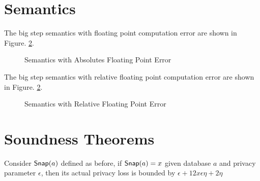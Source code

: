 \documentclass[a4paper,11pt]{article}
\begin{document}
\section{Semantics}
The big step semantics with floating point computation error are shown in Figure. \ref{fig_semantics}.
\begin{figure}
\caption{Semantics with Absolutes Floating Point Error}
\label{fig_semantics}
\end{figure}

The big step semantics with relative floating point computation error are shown in Figure. \ref{fig_semantics}.
\begin{figure}
\caption{Semantics with Relative Floating Point Error}
\label{fig_semantics}
\end{figure}


\section{Soundness Theorems}


\begin{thm}
Consider $\mathsf{Snap}(a)$ defined as before, if $\mathsf{Snap}(a) = x$ given database $a$ and privacy parameter $\epsilon$, then its actual privacy loss is bounded by $\epsilon + 12 x \epsilon \eta + 2\eta$
\end{thm}
\end{document}
